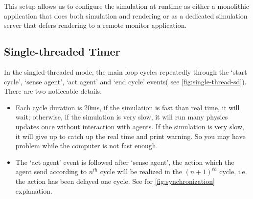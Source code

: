 This setup allows us to configure the simulation at runtime as either
a monolithic application that does both simulation and rendering or as
a dedicated simulation server that defers rendering to a remote
monitor application.

\subsection{Single-threaded Timer}

In the singled-threaded mode, the main loop cycles repeatedly through
the `start cycle', `sense agent', `act agent' and `end cycle' events(
see \autoref{fig:single-thread-sd}). There are two noticeable details:
\begin{itemize}
\item Each cycle duration is 20ms, if the simulation is fast than real
  time, it will wait; otherwise, if the simulation is very slow, it
  will run many physics updates once without interaction with agents.
  If the simulation is very slow, it will give up to catch up the real
  time and print warning. So you may have problem while the computer
  is not fast enough.
\item The `act agent' event is followed after `sense agent', the
  action which the agent send according to $n^{th}$ cycle will be
  realized in the $(n+1)^{th}$ cycle, i.e. the action has been delayed
  one cycle. See for \autoref{fig:synchronization} explanation.
\end{itemize}

